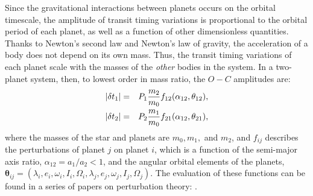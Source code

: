 \documentclass[graybox,natbib,nosecnum]{svmult}
\begin{document}
Since the gravitational interactions between planets occurs on the orbital timescale, the
amplitude of transit timing variations is proportional to the orbital period of each planet,
as well as a function of other dimensionless quantities.  Thanks to Newton's second law
and Newton's law of gravity, the acceleration of a body does not depend on its own mass.
Thus, the transit timing variations of each planet scale with the masses of the {\it other} bodies
in the system.
In a two-planet system, then, to lowest order in mass ratio, the $O-C$ amplitudes are: 
\begin{eqnarray}
\vert \delta t_1\vert &=& P_1 \frac{m_2}{m_0} f_{12}(\alpha_{12},\mathbf{\theta}_{12}),\cr
\vert \delta t_2\vert &=& P_2 \frac{m_1}{m_0} f_{21}(\alpha_{12},\mathbf{\theta}_{21}),
\end{eqnarray}
where the masses of the star and planets are $m_0, m_1,$ and $m_2$, and $f_{ij}$ describes the perturbations of planet $j$ on planet $i$,
which is a function of the semi-major axis ratio, $\alpha_{12}= a_1/a_2 < 1$, and the angular orbital 
elements of the planets, $\mathbf{\theta}_{ij} = (\lambda_i,e_i,\omega_i,I_i,\Omega_i,\lambda_j,e_j,\omega_j,I_j,\Omega_j)$.  The evaluation of these functions can be found in a series of papers on perturbation theory: \cite{2008ApJ...688..636N, 2009ApJ...701.1116N,2010ApJ...709L..44N}.

\end{document}

